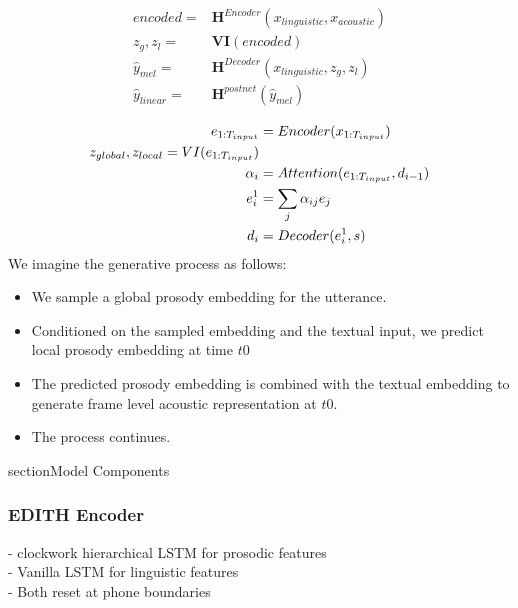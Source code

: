 \begin{equation} \label{eq1}
\begin{split}
encoded ={}& \textbf{H}^{Encoder}(x_{linguistic}, x_{acoustic}) \\
z_{g}, z_{l} ={}& \textbf{VI}(encoded) \\
\hat{y}_{mel} ={}& \textbf{H}^{Decoder}(x_{linguistic},z_{g}, z_{l}) \\
\hat{y}_{linear} ={}& \textbf{H}^{postnet}(\hat{y}_{mel})
\end{split}
\end{equation}

\iffalse
\begin{equation} \label{eq1}
\centering
\begin{split}
e_{1:T_{input}} & = Encoder(x_{1:T_{input}}) \\
z_{global}, z_{local} = VI(e_{1:T_{input}}) \\
\alpha_{i} & = Attention( e_{1:T_{input}}, d_{i-1}) \\
e^1_i &= \sum_j \alpha_{ij} e_j \\
d_i &= Decoder(e^1_i, s)
\end{split}
\end{equation}
We imagine the generative process as follows:

\begin{itemize}
    \item We sample a global prosody embedding for the utterance.
    \item Conditioned on the sampled embedding and the textual input, we predict local prosody embedding at time $t0$
    \item The predicted prosody embedding is combined with the textual embedding to generate frame level acoustic representation at $t0$.
    \item The process continues.
\end{itemize}

section{Model Components}

\subsubsection{EDITH Encoder}

- clockwork hierarchical LSTM for prosodic features \\
- Vanilla LSTM for linguistic features \\
- Both reset at phone boundaries \\



